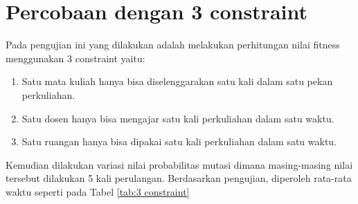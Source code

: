 \section{Percobaan dengan 3 constraint}
\label{sec:pengujian 3}
Pada pengujian ini yang dilakukan adalah melakukan perhitungan nilai fitness menggunakan 3 constraint yaitu:
\begin{enumerate}[nolistsep]
  \item Satu mata kuliah hanya bisa diselenggarakan satu kali dalam satu pekan perkuliahan.
  \item Satu dosen hanya bisa mengajar satu kali perkuliahan dalam satu waktu.
  \item Satu ruangan hanya bisa dipakai satu kali perkuliahan dalam satu waktu.
\end{enumerate} 
Kemudian dilakukan variasi nilai probabilitas mutasi dimana masing-masing nilai tersebut dilakukan 5 kali perulangan. 
Berdasarkan pengujian, diperoleh rata-rata waktu seperti pada Tabel \ref{tab:3 constraint}

